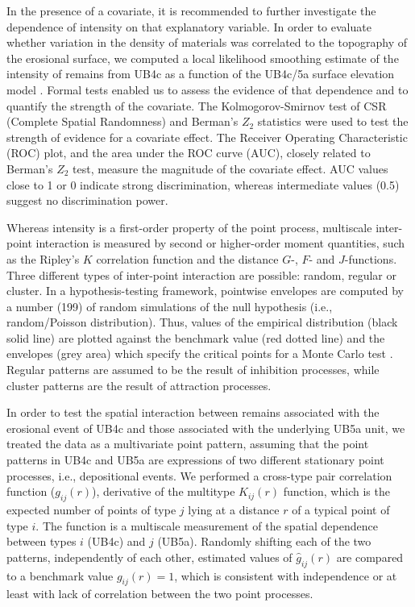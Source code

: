 \documentclass[preprint,authoryear,times]{elsarticle} %
\begin{document}
In the presence of a covariate, it is recommended to further investigate the dependence of intensity on that explanatory variable. In order to evaluate whether variation in the density of materials was correlated to the topography of the erosional surface, we computed a local likelihood smoothing estimate of the intensity of remains from UB4c as a function of the UB4c/5a surface elevation model \citep{Baddeley2012}. Formal tests enabled us to assess the evidence of that dependence and to quantify the strength of the covariate. The Kolmogorov-Smirnov test of CSR (Complete Spatial Randomness) and Berman's $Z_2$ statistics were used to test the strength of evidence for a covariate effect. The Receiver Operating Characteristic (ROC) plot, and the area under the ROC curve (AUC), closely related to Berman's $Z_2$ test, measure the magnitude of the covariate effect. AUC values close to 1 or 0 indicate strong discrimination, whereas intermediate values (0.5) suggest no discrimination power.

Whereas intensity is a first-order property of the point process, multiscale inter-point interaction is measured by second or higher-order moment quantities, such as the Ripley's $K$ correlation function \citep{Ripley1976,Ripley1977} and the distance $G$-, $F$- and $J$-functions. Three different types of inter-point interaction are possible: random, regular or cluster. In a hypothesis-testing framework, pointwise envelopes are computed by a number (199) of random simulations of the null hypothesis (i.e., random/Poisson distribution). Thus, values of the empirical distribution (black solid line) are plotted against the benchmark value (red dotted line) and the envelopes (grey area) which specify the critical points for a Monte Carlo test \citep{Ripley1981}. Regular patterns are assumed to be the result of inhibition processes, while cluster patterns are the result of attraction processes.

In order to test the spatial interaction between remains associated with the erosional event of UB4c and those associated with the underlying UB5a unit, we treated the data as a multivariate point pattern, assuming that the point patterns in UB4c and UB5a are expressions of two different stationary point processes, i.e., depositional events. We performed a cross-type pair correlation function ($g_{ij}(r)$), derivative of the multitype $K_{ij}(r)$ function, which is the expected number of points of type $j$ lying at a distance $r$ of a typical point of type $i$. The function is a multiscale measurement of the spatial dependence between types $i$ (UB4c) and $j$ (UB5a). Randomly shifting each of the two patterns, independently of each other, estimated values of $\hat{g}_{ij}(r)$ are compared to a benchmark value $g_{ij}(r)=1$, which is consistent with independence or at least with lack of correlation between the two point processes.
\end{document}
